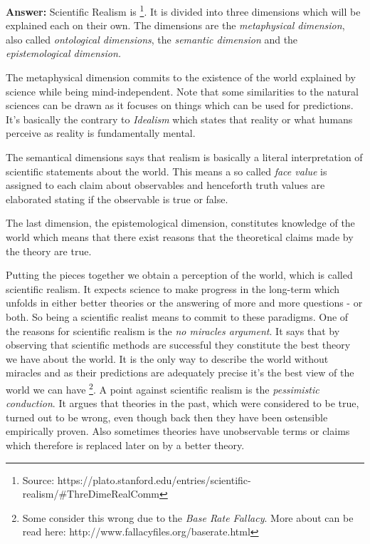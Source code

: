 \documentclass[11pt]{scrartcl}
\begin{document}
\bigbreak

\textbf{Answer:} Scientific Realism is  \footnote{Source: https://plato.stanford.edu/entries/scientific-realism/\#ThreDimeRealComm}. It is divided into three dimensions which will be explained each on their own. The dimensions are the \textit{metaphysical dimension}, also called \textit{ontological dimensions}, the \textit{semantic dimension} and the \textit{epistemological dimension.}

The metaphysical dimension commits to the existence of the world explained by science while being mind-independent. Note that some similarities to the natural sciences can be drawn as it focuses on things which can be used for predictions. It's basically the contrary to \textit{Idealism} which states that reality or what humans perceive as reality is fundamentally mental.

The semantical dimensions says that realism is basically a literal interpretation of scientific statements about the world. This means a so called \textit{face value} is assigned to each claim about observables and henceforth truth values are elaborated stating if the observable is true or false.

The last dimension, the epistemological dimension, constitutes knowledge of the world which means that there exist reasons that the theoretical claims made by the theory are true.

Putting the pieces together we obtain a perception of the world, which is called scientific realism. It expects science to make progress in the long-term which unfolds in either better theories or the answering of more and more questions - or both. So being a scientific realist means to commit to these paradigms. One of the reasons for scientific realism is the \textit{no miracles argument}. It says that by observing that scientific methods are successful they constitute the best theory we have about the world. It is the only way to describe the world without miracles and as their predictions are adequately precise it's the best view of the world we can have \footnote{Some consider this wrong due to the \textit{Base Rate Fallacy}. More about can be read here: http://www.fallacyfiles.org/baserate.html}. A point against scientific realism is the \textit{pessimistic conduction}. It argues that theories in the past, which were considered to be true, turned out to be wrong, even though back then they have been ostensible empirically proven. Also sometimes theories have unobservable terms or claims which therefore is replaced later on by a better theory.
\end{document}
